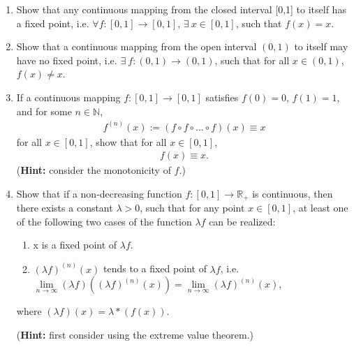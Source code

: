 \documentclass[11pt,letter,notitlepage]{article}
\theoremstyle{definition}
\begin{document}
\begin{exercise}
    \begin{enumerate}
        \item Show that any continuous mapping from the closed interval [0,1] to itself has a fixed point, i.e. $\forall f:[0,1]\to [0,1]$, $\exists \  x\in [0,1]$, such that $f(x) = x$.
        \item Show that a continuous mapping from the open interval $(0,1)$ to itself may have no fixed point, i.e. $\exists \ f:(0,1)\to (0,1)$, such that for all $x\in (0,1)$, $f(x)\neq x$.
        \item If a continuous mapping $f:[0,1]\to [0,1]$ satisfies $f(0)=0$, $f(1)=1$, and for some $n\in \mathbb{N}$, 
        \begin{align*}
            f^{(n)}(x) := (f\circ f\circ ...\circ f)(x) \equiv x
        \end{align*}
        for all $x\in [0,1]$, show that for all $x\in [0,1]$,
        \begin{align*}
            f(x) \equiv x.
        \end{align*}
        (\textbf{Hint:} consider the monotonicity of $f$.)
        \item Show that if a non-decreasing function $f:[0,1]\to \mathbb{R}_{\mathbf {+}}$ is continuous, then there exists a constant $\lambda >0$, such that for any point $x\in[0,1]$, at least one of the following two cases of the function $\lambda f$ can be realized:
        \begin{enumerate}
            \item x is a fixed point of $\lambda f$.
            \item $(\lambda f)^{(n)}(x)$ tends to a fixed point of $\lambda f$, i.e. $\underset{n\to \infty}{\lim}(\lambda f)((\lambda f)^{(n)}(x)) = \underset{n\to \infty}{\lim}(\lambda f)^{(n)}(x)$,
        \end{enumerate}
        where $(\lambda f)(x) = \lambda *(f(x))$.
        
        (\textbf{Hint:} first consider using the extreme value theorem.)
    \end{enumerate}
\end{exercise}
\end{document}
